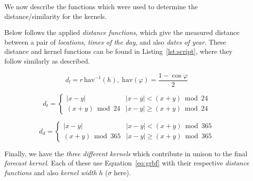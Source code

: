 \documentclass[a4paper, twocolumn]{article}
\begin{document}
    

    We now describe the functions which were used to determine the distance/similarity for the kernels.

    Below follows the applied \emph{distance functions}, which give the measured distance between a pair of \emph{locations}, \emph{times of the day}, and also \emph{dates of year}. These distance and kernel functions can be found in Listing~\ref{lst:script}, where they follow similarly as described.

    \begin{equation*} \label{eq:location}
    d_l = r\, \mathrm{hav}^{-1}(h),\; \mathrm{hav}(\varphi) = \frac{1 - \cos\varphi}{2}
    \end{equation*}
    
    
    
    \begin{equation*} \label{eq:time}
    d_t = \begin{cases}
    |x - y| & |x - y| < (x + y) \bmod 24\\
    (x + y) \bmod 24 & |x - y| \geq (x + y) \bmod 24
    \end{cases}
    \end{equation*}

   

    \begin{equation*} \label{eq:day}
    d_d = \begin{cases}
    |x - y| & |x - y| < (x + y) \bmod 365\\
    (x + y) \bmod 365 & |x - y| \geq (x + y) \bmod 365
    \end{cases}
    \end{equation*}

   

    Finally, we have the \emph{three different kernels} which contribute in unison to the final \emph{forecast kernel}. Each of these use Equation~\ref{eq:grbf} with their respective \emph{distance functions} and also \emph{kernel width} \(h\) (\(\sigma\) here).

    
\end{document}

